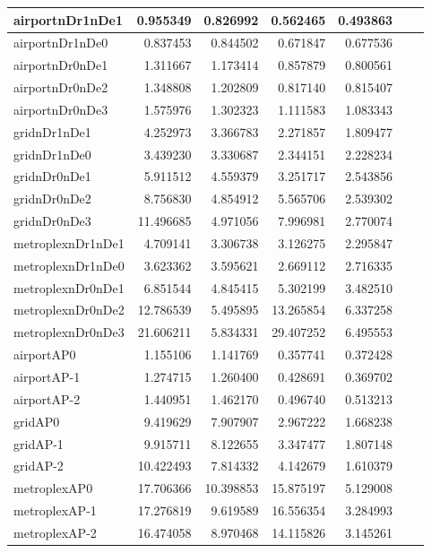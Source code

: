 \begin{longtable}{|l|r|r|r|r|r|r|}
\endlastfoot
airportnDr1nDe1 & 0.955349 & 0.826992 & 0.562465 & 0.493863 \\ \hline
airportnDr1nDe0 & 0.837453 & 0.844502 & 0.671847 & 0.677536 \\ \hline
airportnDr0nDe1 & 1.311667 & 1.173414 & 0.857879 & 0.800561 \\ \hline
airportnDr0nDe2 & 1.348808 & 1.202809 & 0.817140 & 0.815407 \\ \hline
airportnDr0nDe3 & 1.575976 & 1.302323 & 1.111583 & 1.083343 \\ \hline
gridnDr1nDe1 & 4.252973 & 3.366783 & 2.271857 & 1.809477 \\ \hline
gridnDr1nDe0 & 3.439230 & 3.330687 & 2.344151 & 2.228234 \\ \hline
gridnDr0nDe1 & 5.911512 & 4.559379 & 3.251717 & 2.543856 \\ \hline
gridnDr0nDe2 & 8.756830 & 4.854912 & 5.565706 & 2.539302 \\ \hline
gridnDr0nDe3 & 11.496685 & 4.971056 & 7.996981 & 2.770074 \\ \hline
metroplexnDr1nDe1 & 4.709141 & 3.306738 & 3.126275 & 2.295847 \\ \hline
metroplexnDr1nDe0 & 3.623362 & 3.595621 & 2.669112 & 2.716335 \\ \hline
metroplexnDr0nDe1 & 6.851544 & 4.845415 & 5.302199 & 3.482510 \\ \hline
metroplexnDr0nDe2 & 12.786539 & 5.495895 & 13.265854 & 6.337258 \\ \hline
metroplexnDr0nDe3 & 21.606211 & 5.834331 & 29.407252 & 6.495553 \\ \hline
airportAP0 & 1.155106 & 1.141769 & 0.357741 & 0.372428 \\ \hline
airportAP-1 & 1.274715 & 1.260400 & 0.428691 & 0.369702 \\ \hline
airportAP-2 & 1.440951 & 1.462170 & 0.496740 & 0.513213 \\ \hline
gridAP0 & 9.419629 & 7.907907 & 2.967222 & 1.668238 \\ \hline
gridAP-1 & 9.915711 & 8.122655 & 3.347477 & 1.807148 \\ \hline
gridAP-2 & 10.422493 & 7.814332 & 4.142679 & 1.610379 \\ \hline
metroplexAP0 & 17.706366 & 10.398853 & 15.875197 & 5.129008 \\ \hline
metroplexAP-1 & 17.276819 & 9.619589 & 16.556354 & 3.284993 \\ \hline
metroplexAP-2 & 16.474058 & 8.970468 & 14.115826 & 3.145261 \\ \hline

\end{longtable}
